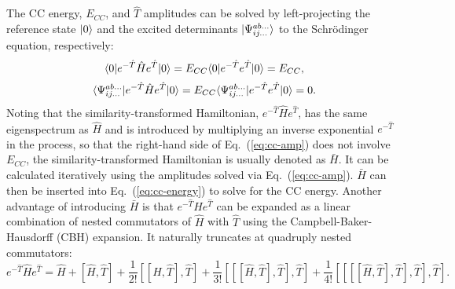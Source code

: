 The CC energy, $E_{CC}$, and $\hat{T}$ amplitudes can be solved by left-projecting the reference state $| 0 \rangle$ and the excited determinants $| \Psi_{ij...}^{ab...} \rangle$ to the Schr\"odinger equation, respectively:
\begin{equation}
\langle0 |e^{-\hat{T}}\hat{H}e^{\hat{T}} | 0 \rangle = E_{CC}\langle0 |e^{-\hat{T}}e^{\hat{T}} | 0 \rangle = E_{CC},
\label{eq:cc-energy}
\end{equation}
\begin{equation}
\langle\Psi_{ij...}^{ab...} |e^{-\hat{T}}\hat{H}e^{\hat{T}} | 0 \rangle = E_{CC}\langle\Psi_{ij...}^{ab...} |e^{-\hat{T}}e^{\hat{T}} | 0 \rangle = 0.
\label{eq:cc-amp}
\end{equation}
Noting that the similarity-transformed Hamiltonian, $e^{-\hat{T}}\hat{H}e^{\hat{T}}$, has the same eigenspectrum as $\hat{H}$ and is introduced by multiplying an inverse exponential $e^{-\hat{T}}$ in the process, so that the right-hand side of Eq.~(\ref{eq:cc-amp}) does not involve $E_{CC}$, the similarity-transformed Hamiltonian is usually denoted as $\bar{H}$. It can be calculated iteratively using the amplitudes solved via Eq.~(\ref{eq:cc-amp}). $\bar{H}$ can then be inserted into Eq.~(\ref{eq:cc-energy}) to solve for the CC energy. Another advantage of introducing $\bar{H}$ is that $e^{-\hat{T}}\hat{H}e^{\hat{T}}$ can be expanded as a linear combination of nested commutators of $\hat{H}$ with $\hat{T}$ using the Campbell-Baker-Hausdorff (CBH) expansion.\cite{Achilles2012} It naturally truncates at quadruply nested commutators:
\begin{equation}
e^{-\hat{T}}\hat{H}e^{\hat{T}} = \hat{H} + [\hat{H}, \hat{T}] + \frac{1}{2!}[[\hat{H}, \hat{T}], \hat{T}] + \frac{1}{3!}[[[\hat{H}, \hat{T}], \hat{T}], \hat{T}]
+ \frac{1}{4!}[[[[\hat{H}, \hat{T}], \hat{T}], \hat{T}], \hat{T}].
\label{eq:cc-cbh}
\end{equation}
